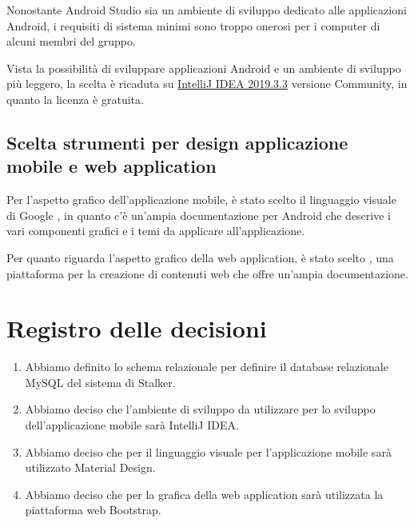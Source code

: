 \documentclass{article}
\begin{document}
Nonostante Android Studio sia un ambiente di sviluppo dedicato alle applicazioni Android, i requisiti di sistema minimi sono troppo onerosi per i computer di alcuni membri del gruppo.

Vista la possibilità di sviluppare applicazioni Android e un ambiente di sviluppo più leggero, la scelta è ricaduta su \href{https://www.jetbrains.com/help/idea/getting-started-with-android-development.html}{IntelliJ IDEA 2019.3.3} versione Community, in quanto la licenza è gratuita.

\subsection{Scelta strumenti per design applicazione mobile e web application}%
\label{sub:scelta_strumenti_per_design_applicazione_mobile_e_web_application}
Per l'aspetto grafico dell'applicazione mobile, è stato scelto il linguaggio visuale di Google \href{https://material.io/develop/android}{}, in quanto c'è un'ampia documentazione per Android che descrive i vari componenti grafici e i temi da applicare all'applicazione.

Per quanto riguarda l'aspetto grafico della web application, è stato scelto \href{https://getbootstrap.com/}{}, una piattaforma per la creazione di contenuti web che offre un'ampia documentazione.



\newpage
\section{Registro delle decisioni}%
\label{sec:registro_delle_decisioni}

\begin{enumerate}
  \item Abbiamo definito lo schema relazionale per definire il database relazionale MySQL del sistema di Stalker.
  \item Abbiamo deciso che l'ambiente di sviluppo da utilizzare per lo sviluppo dell'applicazione mobile sarà IntelliJ IDEA\@.
  \item Abbiamo deciso che per il linguaggio visuale per l'applicazione mobile sarà utilizzato Material Design.
  \item Abbiamo deciso che per la grafica della web application sarà utilizzata la piattaforma web Bootstrap.
\end{enumerate}

\end{document}
